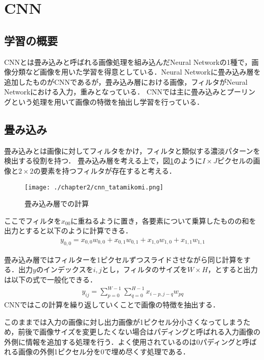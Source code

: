 \section{CNN}
\subsection{学習の概要}
CNNとは畳み込みと呼ばれる画像処理を組み込んだNeural Networkの1種で，画像分類など画像を用いた学習を得意としている．Neural Networkに畳み込み層を追加したものがCNNであるが，畳み込み層における画像，フィルタがNeural Networkにおける入力，重みとなっている．
CNNでは主に畳み込みとプーリングという処理を用いて画像の特徴を抽出し学習を行っている．


\subsection{畳み込み}
畳み込みとは画像に対してフィルタをかけ，フィルタと類似する濃淡パターンを検出する役割を持つ．
畳み込み層を考える上で，図\ref{fig_conv}のように$I \times J$ピクセルの画像と$2 \times 2$の要素を持つフィルタが存在すると考える．
\begin{figure}[htbp]
  \begin{center}
    \texttt{[image: ./chapter2/cnn\_tatamikomi.png]}
    \caption{畳み込み層での計算}
    \label{fig_conv}
  \end{center}
\end{figure}

ここでフィルタを$x_{00}$に重ねるように置き，各要素について乗算したものの和を出力とすると以下のように計算できる．
\begin{align}
  y_{0,0} = x_{0,0}w_{0,0} + x_{0,1}w_{0,1} + x_{1,0}w_{1,0} + x_{1,1}w_{1,1}
  \label{fig_NN1}
\end{align}

畳み込み層ではフィルターを1ピクセルずつスライドさせながら同じ計算をする．出力$y$のインデックスを$i,j$とし，フィルタのサイズを$W\times H$，とすると出力は以下の式で一般化できる．
\begin{align}
  y_{ij} = \sum^{W-1}_{p=0} \sum^{H-1}_{q=0} x_{i-p,j-q}w_{pq}
\end{align}
CNNではこの計算を繰り返していくことで画像の特徴を抽出する．

このままでは入力の画像に対し出力画像が1ピクセル分小さくなってしまうため，前後で画像サイズを変更したくない場合はパディングと呼ばれる入力画像の外側に情報を追加する処理を行う．よく使用されているのは0パディングと呼ばれる画像の外側1ピクセル分を0で埋め尽くす処理である．

